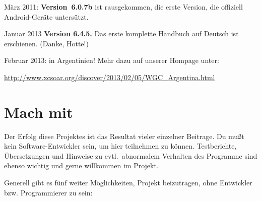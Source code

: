 März 2011: {\bf Version~6.0.7b} ist rausgekommen, die erste Version, die offiziell  Android-Geräte untersützt.

Januar 2013 {\bf Version 6.4.5.} Das erste komplette Handbuch auf Deutsch ist erschienen. (Danke, Hotte!)

Februar 2013:  in Argentinien! Mehr dazu auf unserer Hompage unter: 

\url{http://www.xcsoar.org/discover/2013/02/05/WGC_Argentina.html}

\section{Mach mit}

Der Erfolg diese Projektes ist das Resultat vieler einzelner Beitrage. Du mußt kein Software-Entwickler sein, um hier teilnehmen zu können.
Testberichte, Übersetzungen und Hinweise zu evtl.\ abnormalem Verhalten des Programme sind ebenso wichtig und gerne willkommen
im Projekt.

Generell gibt es fünf weiter Möglichkeiten, Projekt beizutragen, ohne Entwickler bzw. Programmierer zu sein:

